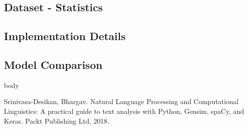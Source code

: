 \documentclass{article}
\begin{document}
\subsection{Dataset - Statistics}
\subsection{Implementation Details}
\subsection{Model Comparison}



body

\begin{thebibliography}{10}

 Srinivasa-Desikan, Bhargav. Natural Language Processing and Computational Linguistics: A practical guide to text analysis with Python, Gensim, spaCy, and Keras. Packt Publishing Ltd, 2018.

\end{thebibliography}
\end{document}
